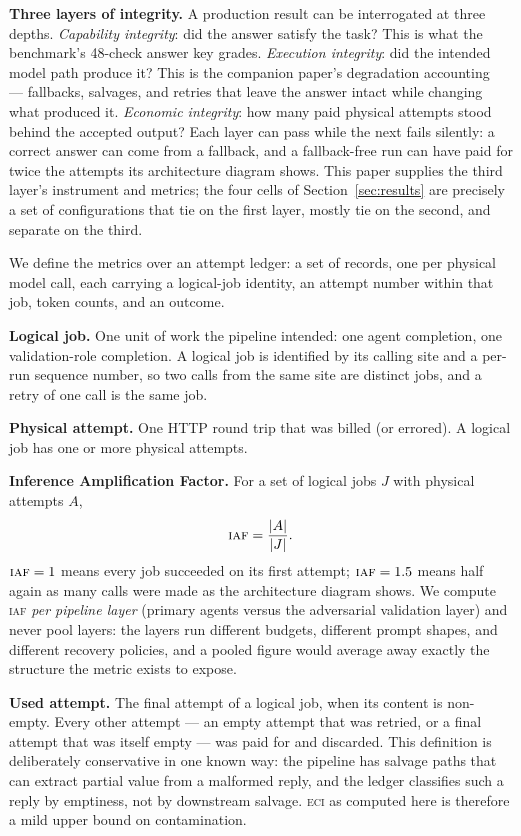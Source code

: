 \documentclass[11pt]{article}
\newcommand{\iaf}{\textsc{iaf}}
\newcommand{\eci}{\textsc{eci}}
\begin{document}
\textbf{Three layers of integrity.} A production result can be
interrogated at three depths. \emph{Capability integrity}: did the
answer satisfy the task? This is what the benchmark's 48-check answer
key grades. \emph{Execution integrity}: did the intended model path
produce it? This is the companion paper's degradation
accounting~\cite{reliability} --- fallbacks, salvages, and retries that
leave the answer intact while changing what produced it.
\emph{Economic integrity}: how many paid physical attempts stood behind
the accepted output? Each layer can pass while the next fails silently:
a correct answer can come from a fallback, and a fallback-free run can
have paid for twice the attempts its architecture diagram shows. This
paper supplies the third layer's instrument and metrics; the four cells
of Section~\ref{sec:results} are precisely a set of configurations that
tie on the first layer, mostly tie on the second, and separate on the
third.

We define the metrics over an attempt ledger: a set of records, one per
physical model call, each carrying a logical-job identity, an attempt
number within that job, token counts, and an outcome.

\textbf{Logical job.} One unit of work the pipeline intended: one agent
completion, one validation-role completion. A logical job is identified
by its calling site and a per-run sequence number, so two calls from
the same site are distinct jobs, and a retry of one call is the same
job.

\textbf{Physical attempt.} One HTTP round trip that was billed (or
errored). A logical job has one or more physical attempts.

\textbf{Inference Amplification Factor.} For a set of logical jobs $J$
with physical attempts $A$,
\[
\iaf{} = \frac{|A|}{|J|}.
\]
$\iaf{} = 1$ means every job succeeded on its first attempt; $\iaf{} =
1.5$ means half again as many calls were made as the architecture
diagram shows. We compute \iaf{} \emph{per pipeline layer} (primary
agents versus the adversarial validation layer) and never pool layers:
the layers run different budgets, different prompt shapes, and
different recovery policies, and a pooled figure would average away
exactly the structure the metric exists to expose.

\textbf{Used attempt.} The final attempt of a logical job, when its
content is non-empty. Every other attempt --- an empty attempt that was
retried, or a final attempt that was itself empty --- was paid for and
discarded. This definition is deliberately conservative in one known
way: the pipeline has salvage paths that can extract partial value from
a malformed reply, and the ledger classifies such a reply by emptiness,
not by downstream salvage. \eci{} as computed here is therefore a mild
upper bound on contamination.
\end{document}
